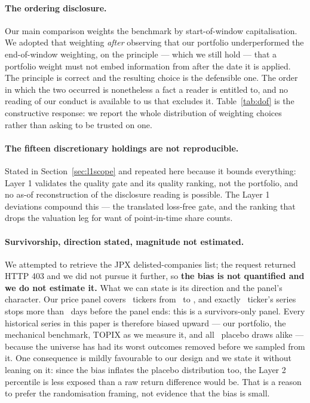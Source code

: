 \documentclass[a4paper,11pt]{article}
\begin{document}
\paragraph{The ordering disclosure.} Our main comparison weights the benchmark by
start-of-window capitalisation. We adopted that weighting \emph{after} observing that our portfolio
underperformed the end-of-window weighting, on the principle --- which we still hold --- that a
portfolio weight must not embed information from after the date it is applied. The principle is
correct and the resulting choice is the defensible one. The order in which the two occurred is
nonetheless a fact a reader is entitled to, and no reading of our conduct is available to us that
excludes it. Table~\ref{tab:dof} is the constructive response: we report the whole distribution of
weighting choices rather than asking to be trusted on one.

\paragraph{The fifteen discretionary holdings are not reproducible.} Stated in
Section~\ref{sec:l1scope} and repeated here because it bounds everything: Layer 1 validates the
quality gate and its quality ranking, not the portfolio, and no as-of reconstruction of the
disclosure reading is possible. The Layer 1 deviations compound this --- the translated loss-free
gate, and the ranking that drops the valuation leg for want of point-in-time share counts.

\paragraph{Survivorship, direction stated, magnitude not estimated.} We attempted to retrieve the
JPX delisted-companies list; the request returned HTTP 403 and we did not pursue it further, so
\textbf{the bias is not quantified and we do not estimate it.} What we can state is its direction and
the panel's character. Our price panel covers \SurvTickers\ tickers from \SurvStart\ to
\SurvEnd, and exactly \SurvStopped\ ticker's series stops more than \SurvThreshold\ days before the panel ends:
this is a survivors-only panel. Every historical series in this paper is therefore biased upward ---
our portfolio, the mechanical benchmark, TOPIX as we measure it, and all
\LtwoDraws\ placebo draws alike --- because the universe has had its worst outcomes removed before
we sampled from it. One consequence is mildly favourable to our design and we state it without
leaning on it: since the bias inflates the placebo distribution too, the Layer 2 percentile is less
exposed than a raw return difference would be. That is a reason to prefer the randomisation framing,
not evidence that the bias is small.
\end{document}
